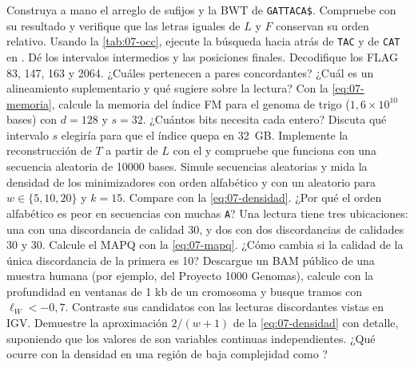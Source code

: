 \begin{ejercicios}
 Construya a mano el arreglo de sufijos y la BWT de \texttt{GATTACA\$}. Compruebe con  su resultado y verifique que las letras iguales de $L$ y $F$ conservan su orden relativo.
 Usando la \cref{tab:07-occ}, ejecute la búsqueda hacia atrás de \texttt{TAC} y de \texttt{CAT} en \capsieteT. Dé los intervalos intermedios y las posiciones finales.
 Decodifique los FLAG 83, 147, 163 y 2064. ¿Cuáles pertenecen a pares concordantes? ¿Cuál es un alineamiento suplementario y qué sugiere sobre la lectura?
 Con la \cref{eq:07-memoria}, calcule la memoria del índice FM para el genoma de trigo ($1{,}6\times10^{10}$ bases) con $d=128$ y $s=32$. ¿Cuántos bits necesita cada entero? Discuta qué intervalo $s$ elegiría para que el índice quepa en 32~GB.
 Implemente la reconstrucción de $T$ a partir de $L$ con el  y compruebe que funciona con una secuencia aleatoria de \num{10000} bases.
 Simule secuencias aleatorias y mida la densidad de los minimizadores con orden alfabético y con un  aleatorio para $w\in\{5,10,20\}$ y $k=15$. Compare con la \cref{eq:07-densidad}. ¿Por qué el orden alfabético es peor en secuencias con muchas \texttt{A}?
 Una lectura tiene tres ubicaciones: una con una discordancia de calidad 30, y dos con dos discordancias de calidades 30 y 30. Calcule el MAPQ con la \cref{eq:07-mapq}. ¿Cómo cambia si la calidad de la única discordancia de la primera es 10?
 Descargue un BAM público de una muestra humana (por ejemplo, del Proyecto 1000 Genomas), calcule con  la profundidad en ventanas de 1 kb de un cromosoma y busque tramos con $\ell_W<-0{,}7$. Contraste sus candidatos con las lecturas discordantes vistas en IGV.
 Demuestre la aproximación $2/(w+1)$ de la \cref{eq:07-densidad} con detalle, suponiendo que los valores de  son variables continuas independientes. ¿Qué ocurre con la densidad en una región de baja complejidad como ?
\end{ejercicios}

